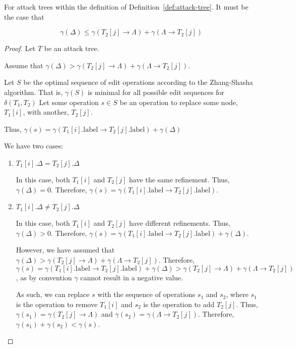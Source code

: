 \begin{lemma}\label{lem:gamma-delta-2}
For attack trees within the definition of Definition~\ref{def:attack-tree}. It must be the case that

\[\gamma(\Delta) \le \gamma(T_2[j] \rightarrow {\Lambda}) + \gamma(\Lambda \rightarrow {T_2[j]})\]

\begin{proof}
Let $T$ be an attack tree.

Assume that $\gamma(\Delta) > \gamma(T_2[j] \rightarrow {\Lambda}) + \gamma(\Lambda \rightarrow {T_2[j]})$.

Let $S$ be the optimal sequence of edit operations according to the Zhang-Shasha algorithm. That is, $\gamma(S)$ is minimal for all possible edit sequences for $\delta(T_1, T_2)$ Let some operation $s \in S$ be an operation to replace some node, $T_1[i]$, with another, $T_2[j]$.

Thus, $\gamma(s) = \gamma({T_1[i].\text{label}} \rightarrow {T_2[j].\text{label}}) + \gamma(\Delta)$

We have two cases:

\begin{enumerate}
\item $T_1[i].\Delta = T_2[j].\Delta$ 

In this case, both $T_1[i]$ and $T_2[j]$ have the same refinement. Thus, $\gamma(\Delta) = 0$. Therefore, $\gamma(s) = \gamma({T_1[i].\text{label}} \rightarrow {T_2[j].\text{label}})$. 

\item $T_1[i].\Delta \ne T_2[j].\Delta$

In this case, both $T_1[i]$ and $T_2[j]$ have different refinements. Thus, $\gamma(\Delta) > 0$. Therefore, $\gamma(s) = \gamma({T_1[i].\text{label}} \rightarrow {T_2[j].\text{label}}) + \gamma(\Delta)$.

However, we have assumed that $\gamma(\Delta) > \gamma(T_2[j] \rightarrow {\Lambda}) + \gamma(\Lambda \rightarrow {T_2[j]})$. Therefore, $\gamma(s) = \gamma({T_1[i].\text{label}} \rightarrow {T_2[j].\text{label}}) + \gamma(\Delta) > \gamma(T_2[j] \rightarrow {\Lambda}) + \gamma(\Lambda \rightarrow {T_2[j]})$, as by convention $\gamma$ cannot result in a negative value.

As such, we can replace $s$ with the sequence of operations $s_1$ and $s_2$, where $s_1$ is the operation to remove $T_1[i]$ and $s_2$ is the operation to add $T_2[j]$. Thus, $\gamma(s_1) = \gamma(T_2[j] \rightarrow {\Lambda})$ and $\gamma(s_2) = \gamma(\Lambda \rightarrow {T_2[j]})$. Therefore, $\gamma(s_1) + \gamma(s_2) < \gamma(s)$.


\end{enumerate}
\end{proof}
\end{lemma}
